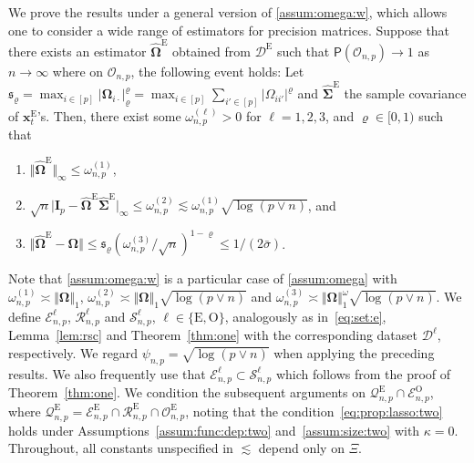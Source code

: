 \documentclass[11pt, a4paper]{article}
\newcommand{\mbf}{\mathbf}
\newcommand{\mc}{\mathcal}
\def\wh{\widehat}
\newcommand{\p}{\mathsf{P}}
\newcommand{\tE}{\text{E}}
\newcommand{\tO}{\text{O}}
\theoremstyle{definition}
\theoremstyle{definition}
\theoremstyle{definition}
\theoremstyle{definition}
\theoremstyle{definition}
\theoremstyle{remark}
\theoremstyle{definition}
\theoremstyle{definition}
\theoremstyle{definition}
\newenvironment{massum}[1]{%
  \renewcommand\themassuminner{#1}%
  \massuminner
}{\endmassuminner}
\begin{document}
We prove the results under a general version of \cref{assum:omega:w}, which allows one to consider a wide range of estimators for precision matrices. 
\begin{massum}{\ref{assum:omega:w}$^\prime$}[Precision matrix estimator]
	\label{assum:omega}
	Suppose that there exists an estimator $\wh{\bm\Omega}^{\tE}$ obtained from $\mc D^{\tE}$ such that $\p(\mc O_{n, p}) \to 1$ as $n \to \infty$ where on $\mc O_{n, p}$, the following event holds: Let $\mathfrak{s}_{\varrho} = \max_{i \in [p]} \vert \bm\Omega_{i\cdot} \vert_{\varrho}^{\varrho} = \max_{i \in [p]} \sum_{i' \in [p]} \vert \Omega_{ii'} \vert^{\varrho}$ and $\wh{\bm\Sigma}^{\tE}$ the sample covariance of $\mbf x^{\tE}_t$'s.
	Then, there exist some $\omega^{(\ell)}_{n, p} > 0$ for $\ell = 1, 2, 3$, and $\varrho \in [0, 1)$ such that
\begin{enumerate}[label = (\roman*)]
    \item \label{assum:omega:one} $\Vert \wh{\bm\Omega}^{\tE} \Vert_\infty \le \omega^{(1)}_{n, p}$, 
    \item \label{assum:omega:two} $\sqrt{n} \vert \mbf I_p - \wh{\bm\Omega}^{\tE} \wh{\bm\Sigma}^{\tE} \vert_\infty \le \omega^{(2)}_{n, p} \lesssim \omega^{(1)}_{n, p} \sqrt{\log(p 
    \vee n)}$, and
    \item \label{assum:omega:three} $\Vert \wh{\bm\Omega}^{\tE} - \bm\Omega \Vert \le \mathfrak{s}_\varrho (\omega^{(3)}_{n, p}/ \sqrt{n})^{1 - \varrho} \le 1/(2\bar{\sigma})$.
\end{enumerate}
\end{massum}
Note that \cref{assum:omega:w} is a particular case of \cref{assum:omega} with $\omega^{(1)}_{n,p} \asymp \Vert\bm\Omega\Vert_1$, $\omega^{(2)}_{n,p} \asymp \Vert\bm\Omega\Vert_1 \sqrt{\log(p \vee n)}$ and $\omega^{(3)}_{n,p} \asymp \Vert\bm\Omega\Vert_1^\omega \sqrt{\log(p \vee n)}$.
We define $\mc E^\ell_{n, p}$, $\mc R^\ell_{n, p}$ and $\mc S^\ell_{n, p}$, $\ell \in \{\tE, \tO\}$, analogously as in~\eqref{eq:set:e}, Lemma~\ref{lem:rsc} and Theorem~\ref{thm:one} with the corresponding dataset $\mc D^{\ell}$, respectively.
We regard $\psi_{n, p} = \sqrt{\log(p \vee n)}$ when applying the preceding results.
We also frequently use that $\mc E^\ell_{n, p} \subset \mc S^\ell_{n, p}$ which follows from the proof of Theorem~\ref{thm:one}.
We condition the subsequent arguments on $\mc Q^{\tE}_{n, p} \cap \mc E^{\tO}_{n, p}$, where $\mc Q^{\tE}_{n, p} = \mc E^{\tE}_{n, p} \cap \mc R^{\tE}_{n, p} \cap \mc O^{\tE}_{n, p}$, noting that the condition~\eqref{eq:prop:lasso:two} holds under Assumptions~\ref{assum:func:dep:two} and~\ref{assum:size:two} with $\kappa = 0$.
Throughout, all constants unspecified in $\lesssim$ depend only on $\Xi$.
\end{document}
